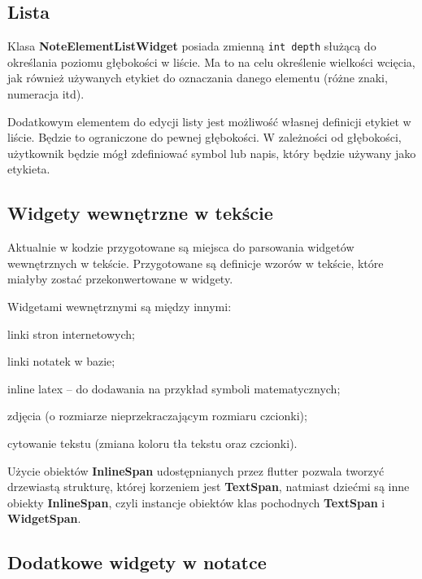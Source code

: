 \subsection{Lista}

Klasa \textbf{NoteElementListWidget} posiada zmienną \verb|int depth| służącą do określania poziomu głębokości w liście. Ma to na celu określenie wielkości wcięcia, jak również używanych etykiet do oznaczania danego elementu (różne znaki, numeracja itd).

Dodatkowym elementem do edycji listy jest możliwość własnej definicji etykiet w liście. Będzie to ograniczone do pewnej głębokości. W zależności od głębokości, użytkownik będzie mógł zdefiniować symbol lub napis, który będzie używany jako etykieta.

\subsection{Widgety wewnętrzne w tekście}

Aktualnie w kodzie przygotowane są miejsca do parsowania widgetów wewnętrznych w tekście. Przygotowane są definicje wzorów w tekście, które miałyby zostać przekonwertowane w widgety.

Widgetami wewnętrznymi są między innymi:

\begin{compactitem}
    \item linki stron internetowych;
    \item linki notatek w bazie;
    \item inline latex -- do dodawania na przykład symboli matematycznych;
    \item zdjęcia (o rozmiarze nieprzekraczającym rozmiaru czcionki);
    \item cytowanie tekstu (zmiana koloru tła tekstu oraz czcionki).
\end{compactitem}

Użycie obiektów \textbf{InlineSpan} udostępnianych przez flutter pozwala tworzyć drzewiastą strukturę, której korzeniem jest \textbf{TextSpan}, natmiast dziećmi są inne obiekty \textbf{InlineSpan}, czyli instancje obiektów klas pochodnych \textbf{TextSpan} i \textbf{WidgetSpan}.

\subsection{Dodatkowe widgety w notatce}

